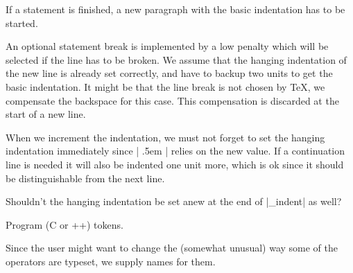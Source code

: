 \documentclass{progltx}
\begin{document}
\sect If a statement is finished, a new paragraph with the basic
indentation has to be started.

An optional statement break is implemented by a low penalty which
will be selected if the line has to be broken. We assume that the
hanging indentation of the new line is already set correctly, and
have to backup two units to get the basic indentation. It might be
that the line break is not chosen by \TeX{}, we compensate the
backspace for this case. This compensation is discarded at the start
of a new line.

\beginprog
\def\cwbb@break{%
    \ifmmode\else
	\endgraf	%
	\noindent
	\hangindent\cwbb@indent  \kern\cwbb@indent
	\copy\cwbb@bakk	%
	\ignorespaces
    \fi
    }
\def\cwbb@opt_break{%
    \hfil \penalty\m@ne
    \hfilneg  \kern .5em  \kern 2\CwebIndentUnit   %
    \copy\cwbb@bakk
    \ignorespaces
    }
\def\cwbb@big_break{%
    \Y
    \cwbb@break
    }
\def\cwbb@expr_break#1{%
    \hfil \penalty#10
    \hfilneg		%
    }
\endprog


\sect When we increment the indentation, we must not forget to set
the hanging indentation immediately since |\cwbb@opt_break| relies on
the new value. If a continuation line is needed it will also be
indented one unit more, which is ok since it should be distinguishable
from the next line.
%
\begin{fixme}
  Shouldn't the hanging indentation be set anew at the end of
  |\cwbb@decr_indent| as well?
\end{fixme}

\beginprog
\def\cwbb@incr_indent{%
    \global\advance\cwbb@indent\CwebIndentUnit
    \hangindent\cwbb@indent
    }
\def\cwbb@decr_indent{\global\advance\cwbb@indent -\CwebIndentUnit}
\def\cwbb@backup{\copy\cwbb@bak}
\def\cwbb@noindent{%
    \hskip -\cwbb@indent \hskip 2\CwebIndentUnit
    }
\endprog




\chap Program (C or \C++) tokens.

Since the user might want to change the (somewhat unusual) way some
of the operators are typeset, we supply names for them.

\beginprog
\let\CwebAnd=\land		%
\let\CwebEquiv=\equiv		%
\let\CwebGe=\ge			%
\let\CwebLe=\le			%
\let\CwebNe=\ne			%
\let\CwebNull=\Lambda		%
\let\CwebNot=\lnot		%
\let\CwebOr=\lor		%
\let\CwebXor=\oplus		%
\endprog
\end{document}
